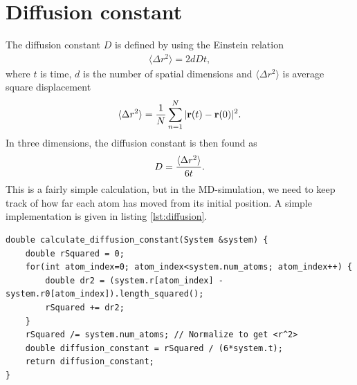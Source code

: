 \section{Diffusion constant}
The diffusion constant $D$ is defined by using the Einstein relation
\begin{align}
    \langle \Delta r^2 \rangle = 2dDt,
\end{align}
where $t$ is time, $d$ is the number of spatial dimensions and $\langle \Delta r^2 \rangle$ is average square displacement 
\begin{align}
    \langle \Delta r^2 \rangle = {1 \over N} \sum_{n=1}^N |\vec r(t) - \vec r(0)|^2.
\end{align}
In three dimensions, the diffusion constant is then found as
\begin{align}
    D = {\langle \Delta r^2 \rangle\over 6t}.
\end{align}
This is a fairly simple calculation, but in the MD-simulation, we need to keep track of how far each atom has moved from its initial position. A simple implementation is given in listing \ref{lst:diffusion}.
\begin{lstlisting}[caption=Calculation of the diffusion constant., label=lst:diffusion]
double calculate_diffusion_constant(System &system) {
    double rSquared = 0;
    for(int atom_index=0; atom_index<system.num_atoms; atom_index++) {
        double dr2 = (system.r[atom_index] - system.r0[atom_index]).length_squared();
        rSquared += dr2;
    }
    rSquared /= system.num_atoms; // Normalize to get <r^2>
    double diffusion_constant = rSquared / (6*system.t);
    return diffusion_constant;
}
\end{lstlisting}
